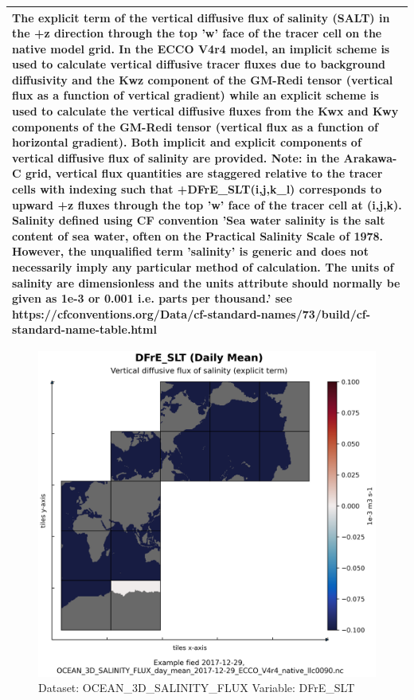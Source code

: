 \begin{longtable}{|p{}|p{}|p{}|p{}|}
\multicolumn{4}{|p{1\textwidth}|}{The explicit term of the vertical diffusive flux of salinity (SALT) in the +z direction through the top 'w' face of the tracer cell on the native model grid. In the ECCO V4r4 model, an implicit scheme is used to calculate vertical diffusive tracer fluxes due to background diffusivity and the Kwz component of the GM-Redi tensor (vertical flux as a function of vertical gradient) while an explicit scheme is used to calculate the vertical diffusive fluxes from the Kwx and Kwy components of the GM-Redi tensor (vertical flux as a function of horizontal gradient). Both implicit and explicit components of vertical diffusive flux of salinity are provided. Note: in the Arakawa-C grid, vertical flux quantities are staggered relative to the tracer cells with indexing such that +DFrE\_SLT(i,j,k\_l) corresponds to upward +z fluxes through the top 'w' face of the tracer cell at (i,j,k). Salinity defined using CF convention 'Sea water salinity is the salt content of sea water, often on the Practical Salinity Scale of 1978. However, the unqualified term 'salinity' is generic and does not necessarily imply any particular method of calculation. The units of salinity are dimensionless and the units attribute should normally be given as 1e-3 or 0.001 i.e. parts per thousand.' see https://cfconventions.org/Data/cf-standard-names/73/build/cf-standard-name-table.html} \\ \hline
\end{longtable}

\begin{figure}[H]
\centering
\includegraphics[width=\textwidth]{../images/plots/native_plots/Ocean_Three-Dimensional_Salinity_Fluxes/DFrE_SLT.png}
\caption{Dataset: OCEAN\_3D\_SALINITY\_FLUX Variable: DFrE\_SLT}
\label{tab:table-OCEAN_3D_SALINITY_FLUX_DFrE_SLT-Plot}
\end{figure}
\pagebreak
